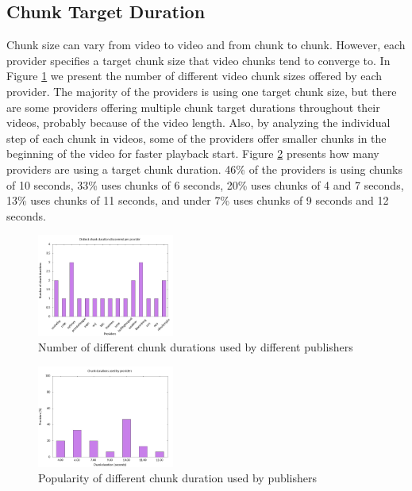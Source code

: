 \documentclass[]{sig-alternate-10pt}
\begin{document}
\hypertarget{chunk-target-duration}{%
\subsection{Chunk Target Duration}\label{chunk-target-duration}}

Chunk size can vary from video to video and from chunk to chunk.
However, each provider specifies a target chunk size that video chunks
tend to converge to. In Figure \ref{fig:chunk1} we present the number of
different video chunk sizes offered by each provider. The majority of
the providers is using one target chunk size, but there are some
providers offering multiple chunk target durations throughout their
videos, probably because of the video length. Also, by analyzing the
individual step of each chunk in videos, some of the providers offer
smaller chunks in the beginning of the video for faster playback start.
Figure \ref{fig:chunk2} presents how many providers are using a target
chunk duration. 46\% of the providers is using chunks of 10 seconds,
33\% uses chunks of 6 seconds, 20\% uses chunks of 4 and 7 seconds, 13\%
uses chunks of 11 seconds, and under 7\% uses chunks of 9 seconds and 12
seconds.

\begin{figure}
\centering
\includegraphics[width=0.4\textwidth]{chunk_targetduration_bar_plot1.jpg}
\caption{Number of different chunk durations used by different publishers}
\label{fig:chunk1}
\end{figure}
\begin{figure}
\centering
\includegraphics[width=0.4\textwidth]{chunk_targetduration_bar_plot2.jpg}
\caption{Popularity of different chunk duration used by publishers}
\label{fig:chunk2}
\end{figure}
\end{document}
